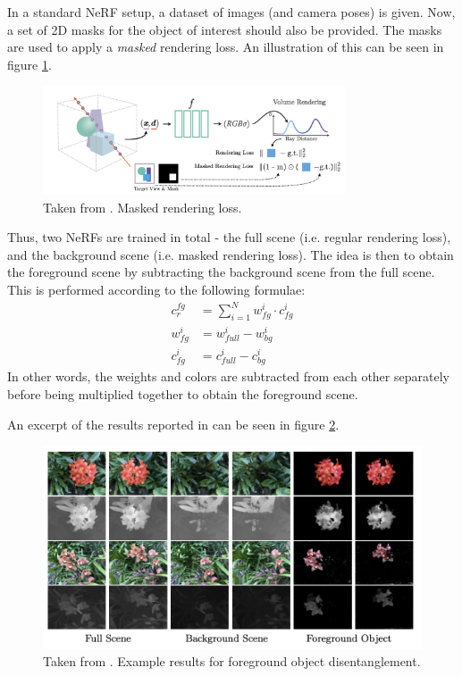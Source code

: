 In a standard NeRF setup, a dataset of images (and camera poses) is given. Now, a set of 2D masks for the object of interest should also be provided. The masks are used to apply a \textit{masked} rendering loss. An illustration of this can be seen in figure \ref{fig:disent-training}.
\begin{figure}[H]
    \centering
    \includegraphics[width=0.8\textwidth]{figures/disent-training.png}
    \caption{Taken from \cite{benaim2022}. Masked rendering loss.}
    \label{fig:disent-training}
\end{figure}

Thus, two NeRFs are trained in total - the full scene (i.e. regular rendering loss), and the background scene (i.e. masked rendering loss). The idea is then to obtain the foreground scene by subtracting the background scene from the full scene. This is performed according to the following formulae:
\begin{align}
    c_{r}^{fg} &= \sum_{i=1}^N w_{fg}^{i} \cdot c_{fg}^{i} \\
    w_{fg}^{i} &= w_{full}^{i} - w_{bg}^{i} \\
    c_{fg}^{i} &= c_{full}^{i} - c_{bg}^{i}
\end{align}
In other words, the weights and colors are subtracted from each other separately before being multiplied together to obtain the foreground scene.

An excerpt of the results reported in \cite{benaim2022} can be seen in figure \ref{fig:disent-results}.
\begin{figure}[H]
    \centering
    \includegraphics[width=1.0\textwidth]{figures/disent-results.png}
    \caption{Taken from \cite{benaim2022}. Example results for foreground object disentanglement.}
    \label{fig:disent-results}
\end{figure}


